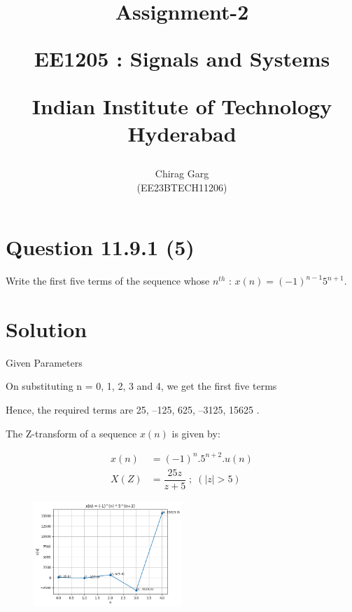 \documentclass[journal,12pt,twocolumn]{IEEEtran}
\theoremstyle{remark}
\begin{document}
%




\vspace{3cm}

\title{
Assignment-2

\large{EE1205 : Signals and Systems}

Indian Institute of Technology Hyderabad
}
\author{Chirag Garg

(EE23BTECH11206)
}	





\maketitle

\newpage



\bigskip

\renewcommand{\thefigure}{\arabic{figure}}
\renewcommand{\thetable}{\arabic{table}}


\section{Question 11.9.1 (5)}
\vspace{0.5cm}
\begin{flushleft}
 Write the first five terms of the sequence whose $n^{th}$  : $x(n) = (-1)^{n-1}5^{n+1}$.
\end{flushleft} 


\vspace{0.8cm}


\section{Solution} 



\begin{table}[htbp]
\centering
\resizebox{\columnwidth}{!}{
}
\caption{ Given Parameters}

\end{table}


On substituting n = 0, 1, 2, 3 and 4, we get the first five terms 

Hence, the required terms are 25, –125, 625, –3125, 15625 .


The Z-transform of a sequence $x(n)$ is given by:

 \begin{align}
	     x(n) &= (-1)^{n}.5^{n+2}.u(n)
	       \\  X(Z) &= \dfrac{25z}{z+5} \; ; \;( |z| > 5 )
 \end{align}


\begin{figure}
  \centering
  \includegraphics[width=0.5\textwidth]{figures/grasi2.png} 
 
\end{figure}
\end{document}

